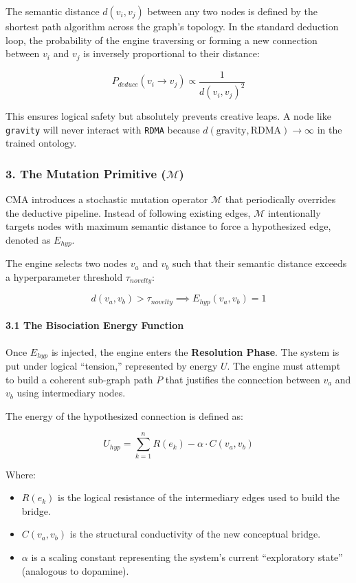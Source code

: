 \documentclass[
  11pt,
  a4paper,
]{article}
\providecommand{\tightlist}{%
  \setlength{\itemsep}{0pt}\setlength{\parskip}{0pt}}
\begin{document}
The semantic distance \(d(v_i, v_j)\) between any two nodes is defined
by the shortest path algorithm across the graph's topology. In the
standard deduction loop, the probability of the engine traversing or
forming a new connection between \(v_i\) and \(v_j\) is inversely
proportional to their distance:

\[ P_{deduce}(v_i \rightarrow v_j) \propto \frac{1}{d(v_i, v_j)^2} \]

This ensures logical safety but absolutely prevents creative leaps. A
node like \texttt{gravity} will never interact with \texttt{RDMA}
because \(d(\text{gravity}, \text{RDMA}) \to \infty\) in the trained
ontology.

\subsubsection{\texorpdfstring{3. The Mutation Primitive
(\(\mathcal{M}\))}{3. The Mutation Primitive (\textbackslash mathcal\{M\})}}\label{the-mutation-primitive-mathcalm}

CMA introduces a stochastic mutation operator \(\mathcal{M}\) that
periodically overrides the deductive pipeline. Instead of following
existing edges, \(\mathcal{M}\) intentionally targets nodes with maximum
semantic distance to force a hypothesized edge, denoted as \(E_{hyp}\).

The engine selects two nodes \(v_a\) and \(v_b\) such that their
semantic distance exceeds a hyperparameter threshold \(\tau_{novelty}\):

\[ d(v_a, v_b) > \tau_{novelty} \implies E_{hyp}(v_a, v_b) = 1 \]

\paragraph{3.1 The Bisociation Energy
Function}\label{the-bisociation-energy-function}

Once \(E_{hyp}\) is injected, the engine enters the \textbf{Resolution
Phase}. The system is put under logical ``tension,'' represented by
energy \(U\). The engine must attempt to build a coherent sub-graph path
\(P\) that justifies the connection between \(v_a\) and \(v_b\) using
intermediary nodes.

The energy of the hypothesized connection is defined as:

\[ U_{hyp} = \sum_{k=1}^{n} R(e_k) - \alpha \cdot C(v_a, v_b) \]

Where:

\begin{itemize}
\tightlist
\item
  \(R(e_k)\) is the logical resistance of the intermediary edges used to
  build the bridge.
\item
  \(C(v_a, v_b)\) is the structural conductivity of the new conceptual
  bridge.
\item
  \(\alpha\) is a scaling constant representing the system's current
  ``exploratory state'' (analogous to dopamine).
\end{itemize}
\end{document}
